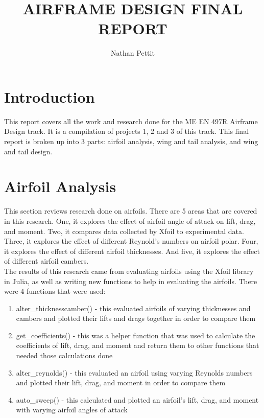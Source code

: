 \documentclass{journal}
\title{AIRFRAME DESIGN FINAL REPORT}
\author{Nathan Pettit}
\begin{document}
	
	\maketitle	
	\section{Introduction}
	This report covers all the work and research done for the ME EN 497R Airframe Design track.
	It is a compilation of projects 1, 2 and 3 of this track. This final report is broken up into 3 parts: airfoil analysis, wing and tail analysis, and wing and tail design.\\
	
	\section{Airfoil Analysis}
	This section reviews research done on airfoils. There are 5 areas that are covered in this research. One, it explores the effect of airfoil angle of attack on lift, drag, and moment. Two, it compares data collected by Xfoil to experimental data. Three, it explores the effect of different Reynold's numbers on airfoil polar. Four, it explores the effect of different airfoil thicknesses. And five, it explores the effect of different airfoil cambers.\\
	
	The results of this research came from evaluating airfoils using the Xfoil library in Julia, as well as writing new functions to help in evaluating the airfoils. There were 4 functions that were  used:\\
	
	\begin{enumerate}
		\item alter\_thicknesscamber() - this evaluated airfoils of varying thicknesses and cambers and plotted their lifts and drags together in order to compare them
		\item get\_coefficients() - this was a helper function that was used to calculate the coefficients of lift, drag, and moment and return them to other functions that needed those calculations done
		\item alter\_reynolds() - this evaluated an airfoil using varying Reynolds numbers and plotted their lift, drag, and moment in order to compare them
		\item auto\_sweep() - this calculated and plotted an airfoil's lift, drag, and moment with varying airfoil angles of attack
	\end{enumerate}
	
\end{document}
